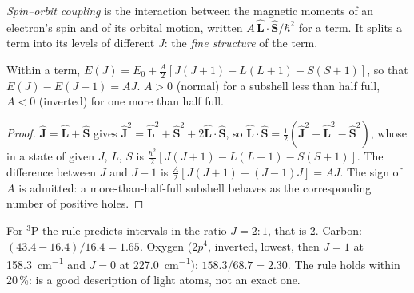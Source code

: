 \begin{definition}\label{def:b3:many-electron-atoms:spin-orbit}
\emph{Spin--orbit coupling} is the interaction
between the magnetic moments of an electron's spin and of its orbital
motion, written $A\,\hat{\mathbf L}\cdot\hat{\mathbf S}/\hbar^2$ for a term. It
splits a term into its levels of different $J$: the \emph{fine
structure} of the term.
\end{definition}

\begin{proposition}\label{prop:b3:many-electron-atoms:lande}
Within a term, $E(J) = E_0 + \frac{A}{2}[J(J+1) - L(L+1) - S(S+1)]$, so that
$E(J) - E(J - 1) = AJ$. $A > 0$ (normal) for a subshell less than half full,
$A < 0$ (inverted) for one more than half full.
\end{proposition}

\begin{proof}
$\hat{\mathbf J} = \hat{\mathbf L} + \hat{\mathbf S}$ gives $\hat{\mathbf J}^2 =
\hat{\mathbf L}^2 + \hat{\mathbf S}^2 + 2\hat{\mathbf L}\cdot\hat{\mathbf S}$, so
$\hat{\mathbf L}\cdot\hat{\mathbf S} = \frac12(\hat{\mathbf J}^2 - \hat{\mathbf L}^2 -
\hat{\mathbf S}^2)$, whose  in a state of given $J$, $L$, $S$ is
$\frac{\hbar^2}{2}[J(J+1) - L(L+1) - S(S+1)]$. The difference between $J$ and
$J - 1$ is $\frac A2[J(J+1) - (J-1)J] = AJ$. The sign of $A$ is admitted: a
more-than-half-full subshell behaves as the corresponding number of positive
holes.
\end{proof}

\begin{example}\label{ex:b3:many-electron-atoms:lande-test}
For ${}^3$P the rule predicts intervals in the ratio $J = 2 : 1$, that is 2.
Carbon: $(43.4 - 16.4)/16.4 = 1.65$. Oxygen ($2p^4$, inverted, 
lowest, then $J = 1$ at \qty{158.3}{cm^{-1}} and $J = 0$ at \qty{227.0}{cm^{-1}}):
$158.3/68.7 = 2.30$. The rule holds within 20\,\%: 
is a good description of light atoms, not an exact one.
\end{example}

